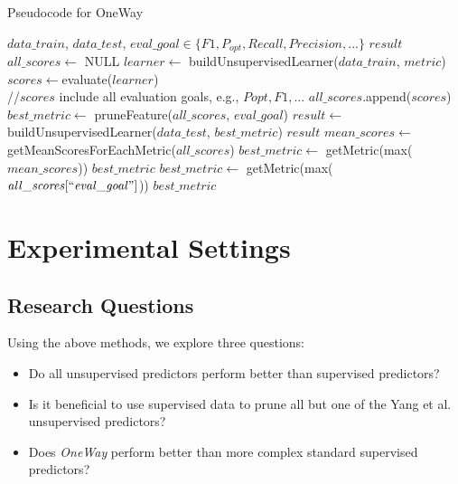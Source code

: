 \documentclass[sigconf]{acmart}
\theoremstyle{break}
\newcommand{\bi}{\begin{itemize}[leftmargin=0.4cm]}
\newcommand{\ei}{\end{itemize}}
\begin{document}
\begin{algorithm}[!htp]
\small
\caption{Pseudocode for OneWay}
\begin{algorithmic}[1]
\Require $\mathit{data\_train}$, $\mathit{data\_test}$, $\mathit{eval\_goal} \in \{\mathit{F1, P_{opt}, Recall, Precision,...}\}$
\Ensure $\mathit{result}$
\vspace{2mm}
  \State $\mathit{all\_scores} \gets$ NULL
      \State $\mathit{learner}\gets$ buildUnsupervisedLearner($\mathit{data\_train}$, $\mathit{metric}$)
      \State $\mathit{scores} \gets $evaluate($\mathit{learner}$)\\
      \quad \qquad //$\mathit{scores}$ include all evaluation goals, e.g., $\mathit{Popt,F1,...}$
      \State $\mathit{all\_scores}$.append($\mathit{scores}$)
  \EndFor
  \State $\mathit{best\_metric} \gets$ pruneFeature($\mathit{all\_scores}$, $\mathit{eval\_goal}$)
  \State $\mathit{result} \gets$ buildUnsupervisedLearner($\mathit{data\_test}$, $\mathit{best\_metric}$)
  \State \Return $\mathit{result}$
\EndFunction
{}
    \State $\mathit{ mean\_scores} \gets$ getMeanScoresForEachMetric($\mathit{all\_scores}$)
    \State $ \mathit{best\_metric} \gets$ getMetric(max($\mathit{mean\_scores}$)) 
    \State \Return $\mathit{best\_metric}$
   \Else
     \State $\mathit{best\_metric} \gets$ getMetric(max($\mathit{all\_scores[``eval\_goal"]}$))
     \State\Return $\mathit{best\_metric}$
  \EndIf
\EndFunction
\end{algorithmic}
\label{alg:OneWay}
\end{algorithm}

 




\section{Experimental Settings}\label{experiment}

\subsection{Research Questions}
Using the above methods, we explore three questions:
\bi 
\item Do all unsupervised predictors perform better than supervised predictors?
\item Is it beneficial to use supervised data to prune all but one of the Yang et al. unsupervised predictors?
\item Does {\it OneWay} perform  better than more complex standard supervised predictors?
\ei
\end{document}
